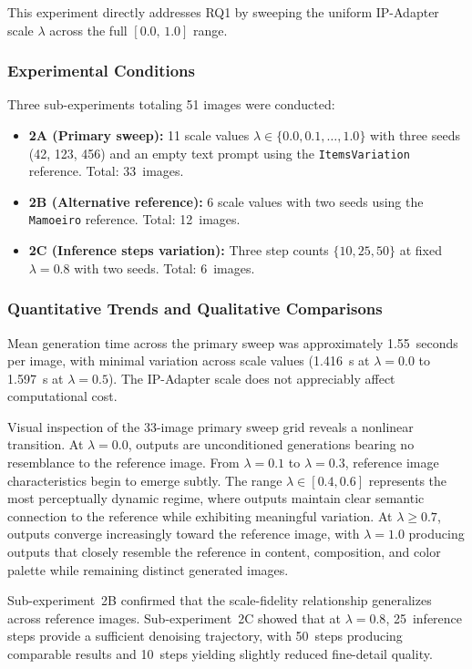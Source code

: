 \documentclass[conference]{IEEEtran}
\newcommand{\ipadapter}{IP-Adapter}
\begin{document}
This experiment directly addresses RQ1 by sweeping the uniform \ipadapter{} scale \(\lambda\) across the full \([0.0,\,1.0]\) range.

\subsubsection{Experimental Conditions}
Three sub-experiments totaling 51 images were conducted:
\begin{itemize}
\item \textbf{2A (Primary sweep):} 11 scale values \(\lambda \in \{0.0, 0.1, \ldots, 1.0\}\) with three seeds (42, 123, 456) and an empty text prompt using the \texttt{ItemsVariation} reference. Total: 33~images.
\item \textbf{2B (Alternative reference):} 6 scale values with two seeds using the \texttt{Mamoeiro} reference. Total: 12~images.
\item \textbf{2C (Inference steps variation):} Three step counts \(\{10, 25, 50\}\) at fixed \(\lambda = 0.8\) with two seeds. Total: 6~images.
\end{itemize}

\subsubsection{Quantitative Trends and Qualitative Comparisons}
Mean generation time across the primary sweep was approximately 1.55~seconds per image, with minimal variation across scale values (1.416~s at \(\lambda = 0.0\) to 1.597~s at \(\lambda = 0.5\)). The \ipadapter{} scale does not appreciably affect computational cost.

Visual inspection of the 33-image primary sweep grid reveals a nonlinear transition. At \(\lambda = 0.0\), outputs are unconditioned generations bearing no resemblance to the reference image. From \(\lambda = 0.1\) to \(\lambda = 0.3\), reference image characteristics begin to emerge subtly. The range \(\lambda \in [0.4, 0.6]\) represents the most perceptually dynamic regime, where outputs maintain clear semantic connection to the reference while exhibiting meaningful variation. At \(\lambda \geq 0.7\), outputs converge increasingly toward the reference image, with \(\lambda = 1.0\) producing outputs that closely resemble the reference in content, composition, and color palette while remaining distinct generated images.

Sub-experiment~2B confirmed that the scale-fidelity relationship generalizes across reference images. Sub-experiment~2C showed that at \(\lambda = 0.8\), 25~inference steps provide a sufficient denoising trajectory, with 50~steps producing comparable results and 10~steps yielding slightly reduced fine-detail quality.
\end{document}
